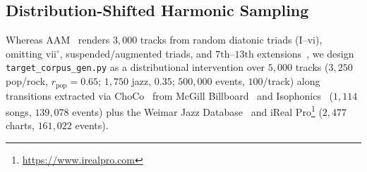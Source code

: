 \documentclass{article}
\begin{document}
\subsection{Distribution-Shifted Harmonic Sampling}\label{subsec:harmonic_sampling}

Whereas AAM~\cite{ostermann2023aam} renders $3{,}000$ tracks from random diatonic triads ($\text{I}$--$\text{vi}$), omitting $\text{vii}^\circ$, suspended/augmented triads, and $7\text{th}$--$13\text{th}$ extensions~\cite{majchrzak2026training}, we design {\small\texttt{target\_corpus\_gen.py}} as a distributional intervention over $5{,}000$ tracks ($3{,}250$ pop/rock, $r_{\text{pop}} = 0.65$; $1{,}750$ jazz, $0.35$; $500{,}000$ events, $100$/track) along transitions extracted via ChoCo~\cite{deberardinis2023choco} from McGill Billboard~\cite{burgoyne2011expert} and Isophonics~\cite{mauch2009omras} ($1{,}114$ songs, $139{,}078$ events) plus the Weimar Jazz Database~\cite{pfleiderer2017inside} and iReal Pro\footnote{\url{https://www.irealpro.com}} ($2{,}477$ charts, $161{,}022$ events).
\end{document}
